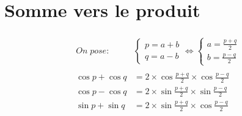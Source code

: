 \documentclass[a4paper]{article}
\begin{document}
	\section{Somme vers le produit}
	\begin{gather*}
		\begin{split}
			On\;pose:&
			\begin{cases}
				p = a + b\\
				q = a - b	
			\end{cases}
			\Leftrightarrow
			\begin{cases}
				a = \frac{p+q}{2}\\
				b = \frac{p-q}{2}
			\end{cases}
			\\\\
			\cos{p}+\cos{q} &= 2\times\cos{\frac{p+q}{2}}\times\cos{\frac{p-q}{2}}\\
			\cos{p}-\cos{q} &= 2\times\sin{\frac{p+q}{2}}\times\sin{\frac{p-q}{2}}\\
			\sin{p}+\sin{q} &= 2\times\sin{\frac{p+q}{2}}\times\cos{\frac{p-q}{2}}
		\end{split}
	\end{gather*}

	\newpage
\end{document}
